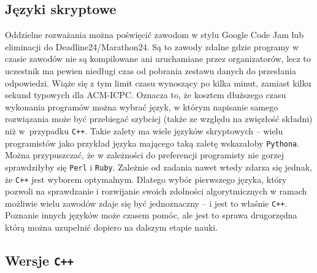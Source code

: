 \subsection{Języki skryptowe}
Oddzielne rozważania można poświęcić zawodom w stylu Google Code Jam lub
eliminacji do Deadline24/Marathon24. Są to zawody zdalne gdzie programy w czasie
zawodów nie są kompilowane ani uruchamiane przez organizatorów, lecz to
uczestnik ma pewien niedługi czas od pobrania zestawu danych do przesłania
odpowiedzi. Wiąże się z tym limit czasu wynoszący po kilka minut, zamiast
kilku sekund typowych dla ACM-ICPC. Oznacza to, że kosztem dłuższego czasu
wykonania programów można wybrać język, w którym napisanie samego rozwiązania
może być przebiegać szybciej (także ze względu na zwięzłość składni) niż
w~przypadku \texttt{C++}. Takie zalety ma wiele języków skryptowych -- wielu
programistów jako przykład języka mającego taką zaletę wskazałoby
\texttt{Pythona}. Można przypuszczać, że w zależności do preferencji programisty
nie gorzej sprawdziłyby się \texttt{Perl} i \texttt{Ruby}. Zależnie od zadania
nawet wtedy zdarza się jednak, że \texttt{C++} jest wyborem optymalnym. Dlatego
wybór pierwszego języka, który pozwoli na sprawdzanie i rozwijanie swoich
zdolności algorytmicznych w ramach możliwie wielu zawodów zdaje się być
jednoznaczny -- i jest to właśnie \texttt{C++}. Poznanie innych języków może
czasem pomóc, ale jest to sprawa drugorzędna którą można uzupełnić dopiero
na dalszym etapie nauki.

\subsection{Wersje \texttt{C++}}

